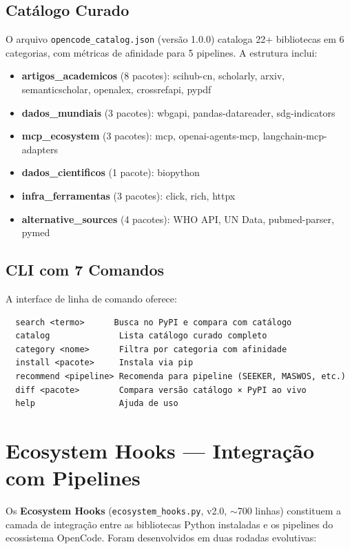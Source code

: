 \documentclass[12pt,a4paper]{article}
\begin{document}
\subsection{Catálogo Curado}

O arquivo \texttt{opencode\_catalog.json} (versão 1.0.0) cataloga 22+ bibliotecas em 6 categorias, com métricas de afinidade para 5 pipelines. A estrutura inclui:

\begin{itemize}
  \item \textbf{artigos\_academicos} (8 pacotes): scihub-cn, scholarly, arxiv, semanticscholar, openalex, crossrefapi, pypdf
  \item \textbf{dados\_mundiais} (3 pacotes): wbgapi, pandas-datareader, sdg-indicators
  \item \textbf{mcp\_ecosystem} (3 pacotes): mcp, openai-agents-mcp, langchain-mcp-adapters
  \item \textbf{dados\_cientificos} (1 pacote): biopython
  \item \textbf{infra\_ferramentas} (3 pacotes): click, rich, httpx
  \item \textbf{alternative\_sources} (4 pacotes): WHO API, UN Data, pubmed-parser, pymed
\end{itemize}

\subsection{CLI com 7 Comandos}

A interface de linha de comando oferece:

\begin{verbatim}
  search <termo>      Busca no PyPI e compara com catálogo
  catalog              Lista catálogo curado completo
  category <nome>      Filtra por categoria com afinidade
  install <pacote>     Instala via pip
  recommend <pipeline> Recomenda para pipeline (SEEKER, MASWOS, etc.)
  diff <pacote>        Compara versão catálogo × PyPI ao vivo
  help                 Ajuda de uso
\end{verbatim}

\section{Ecosystem Hooks — Integração com Pipelines}

Os \textbf{Ecosystem Hooks} (\texttt{ecosystem\_hooks.py}, v2.0, $\sim$700 linhas) constituem a camada de integração entre as bibliotecas Python instaladas e os pipelines do ecossistema OpenCode. Foram desenvolvidos em duas rodadas evolutivas:
\end{document}

